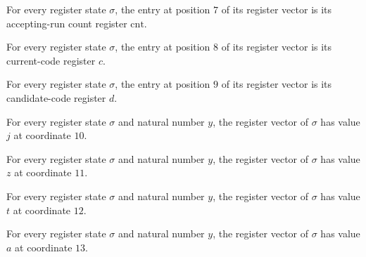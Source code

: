 \begin{lemma}
\label{Randomized.PolyAmp.Reg.v_7}
\leanok
{}
For every register state $\sigma$, the entry at position $7$ of its register vector is
its accepting-run count register $\mathrm{cnt}$.
\end{lemma}

\begin{lemma}
\label{Randomized.PolyAmp.Reg.v_8}
\leanok
{}
For every register state $\sigma$, the entry at position $8$ of its register vector is
its current-code register $c$.
\end{lemma}

\begin{lemma}
\label{Randomized.PolyAmp.Reg.v_9}
\leanok
{}
For every register state $\sigma$, the entry at position $9$ of its register vector is
its candidate-code register $d$.
\end{lemma}

\begin{lemma}
\label{Randomized.PolyAmp.Reg.v_10}
\leanok
{}
For every register state $\sigma$ and natural number $y$, the register vector of
$\sigma$ has value $j$ at coordinate $10$.
\end{lemma}

\begin{lemma}
\label{Randomized.PolyAmp.Reg.v_11}
\leanok
{}
For every register state $\sigma$ and natural number $y$, the register vector of
$\sigma$ has value $z$ at coordinate $11$.
\end{lemma}

\begin{lemma}
\label{Randomized.PolyAmp.Reg.v_12}
\leanok
{}
For every register state $\sigma$ and natural number $y$, the register vector of
$\sigma$ has value $t$ at coordinate $12$.
\end{lemma}

\begin{lemma}
\label{Randomized.PolyAmp.Reg.v_13}
\leanok
{}
For every register state $\sigma$ and natural number $y$, the register vector of
$\sigma$ has value $a$ at coordinate $13$.
\end{lemma}

